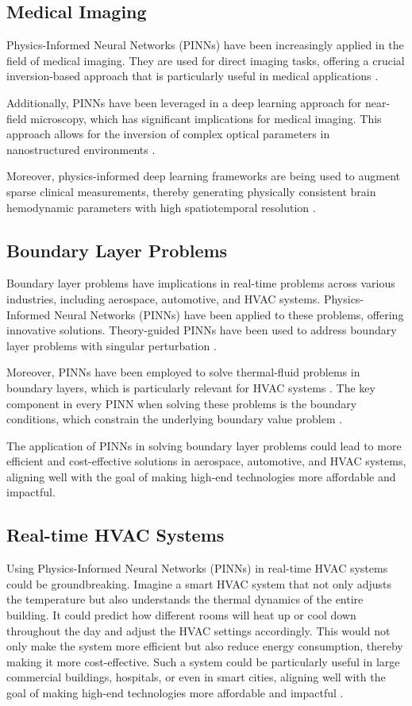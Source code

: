 \documentclass[12pt]{article}
\begin{document}
	\subsection{Medical Imaging}
	Physics-Informed Neural Networks (PINNs) have been increasingly applied in the field of medical imaging. They are used for direct imaging tasks, offering a crucial inversion-based approach that is particularly useful in medical applications \cite{ieee-medical}.
	
	Additionally, PINNs have been leveraged in a deep learning approach for near-field microscopy, which has significant implications for medical imaging. This approach allows for the inversion of complex optical parameters in nanostructured environments \cite{aip-medical}.
	
	Moreover, physics-informed deep learning frameworks are being used to augment sparse clinical measurements, thereby generating physically consistent brain hemodynamic parameters with high spatiotemporal resolution \cite{ncbi-medical}.
	
	\subsection{Boundary Layer Problems}
	Boundary layer problems have implications in real-time problems across various industries, including aerospace, automotive, and HVAC systems. Physics-Informed Neural Networks (PINNs) have been applied to these problems, offering innovative solutions. Theory-guided PINNs have been used to address boundary layer problems with singular perturbation \cite{sciencedirect-boundary1}.
	
	Moreover, PINNs have been employed to solve thermal-fluid problems in boundary layers, which is particularly relevant for HVAC systems \cite{sciencedirect-boundary2}. The key component in every PINN when solving these problems is the boundary conditions, which constrain the underlying boundary value problem \cite{arxiv-boundary}.
	
	The application of PINNs in solving boundary layer problems could lead to more efficient and cost-effective solutions in aerospace, automotive, and HVAC systems, aligning well with the goal of making high-end technologies more affordable and impactful.
	
	\subsection{Real-time HVAC Systems}
	Using Physics-Informed Neural Networks (PINNs) in real-time HVAC systems could be groundbreaking. Imagine a smart HVAC system that not only adjusts the temperature but also understands the thermal dynamics of the entire building. It could predict how different rooms will heat up or cool down throughout the day and adjust the HVAC settings accordingly. This would not only make the system more efficient but also reduce energy consumption, thereby making it more cost-effective. Such a system could be particularly useful in large commercial buildings, hospitals, or even in smart cities, aligning well with the goal of making high-end technologies more affordable and impactful \cite{nature-hvac2}.
	
\end{document}
